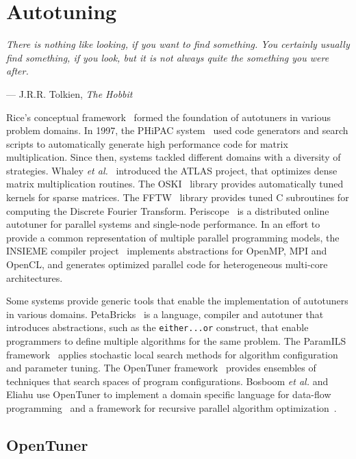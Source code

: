 \chapter{Autotuning}
\label{chap:autotuning}
\epigraph{\textit{There is nothing like looking, if you want to find something. You
certainly usually find something, if you look, but it is not always quite the
something you were after.}}{--- J.R.R. Tolkien, \textit{The Hobbit}}

Rice's conceptual framework~\cite{rice1976algorithm} formed the foundation
of autotuners in various problem domains.  In 1997, the PHiPAC
system~\cite{bilmes1997optimizing} used code generators and search scripts to
automatically generate high performance code
for matrix multiplication. Since then, systems tackled different domains with a
diversity of strategies. Whaley \emph{et al.}~\cite{dongarra1998automatically}
introduced the ATLAS project, that optimizes dense matrix multiplication
routines. The OSKI~\cite{vuduc2005oski} library provides automatically tuned
kernels for sparse matrices. The FFTW~\cite{frigo1998fftw} library provides
tuned C subroutines for computing the Discrete Fourier Transform.
Periscope~\cite{gerndt2010automatic} is a distributed online autotuner for
parallel systems and single-node performance.  In an effort to provide a common
representation of multiple parallel programming models, the INSIEME compiler
project~\cite{jordan2012multi} implements abstractions for OpenMP, MPI and
OpenCL, and generates optimized parallel code for heterogeneous multi-core
architectures.

Some systems provide generic tools that enable the implementation of
autotuners in various domains. PetaBricks~\cite{ansel2009petabricks} is a
language, compiler and autotuner that introduces abstractions, such as the
\texttt{\footnotesize either...or} construct, that enable programmers to define
multiple algorithms for the same problem.  The ParamILS
framework~\cite{hutter2009paramils} applies stochastic local search methods
for algorithm configuration and parameter tuning. The OpenTuner
framework~\cite{ansel2014opentuner} provides ensembles of techniques that
search spaces of program configurations. Bosboom \emph{et al.} and Eliahu use
OpenTuner to implement a domain specific language for data-flow
programming~\cite{bosboom2014streamjit} and a framework for recursive parallel
algorithm optimization~\cite{eliahu2015frpa}.

\section{OpenTuner}
\label{sec:opentuner}

